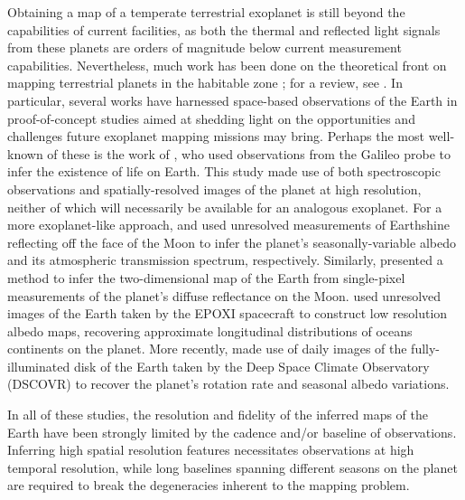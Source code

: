 \documentclass[modern]{aastex62}
\begin{document}
Obtaining a map of a temperate terrestrial exoplanet is still
beyond the capabilities of current facilities, as both the thermal and 
reflected light signals from these planets
are orders of magnitude below current measurement capabilities. Nevertheless,
much work has been done on the theoretical front on mapping terrestrial
planets in the habitable zone
\citep[e.g.,][]{Ford2001,Tinetti2006a,Tinetti2006b,WilliamsGaidos2008,Palle2008,
Kawahara2010,Fujii2012,Berdyugina2017,Haggard2018,Farr2018,Lustig-Yaeger2018};
for a review, see \cite{Cowan2018}. In particular, several works
have harnessed space-based observations of the Earth in proof-of-concept
studies aimed at shedding light on the opportunities and challenges future
exoplanet mapping missions may bring. Perhaps the most well-known of these
is the work of \cite{Sagan1993}, who used observations from the Galileo probe
to infer the existence of life on Earth. This study made use of both
spectroscopic observations and spatially-resolved images of the planet at high
resolution, neither of which will necessarily be available for an analogous exoplanet. 
For a more exoplanet-like approach, \cite{Goode2001} and \cite{Woolf2002} used unresolved measurements of
Earthshine reflecting off the face of the Moon to infer the planet's
seasonally-variable albedo and its atmospheric transmission spectrum,
respectively. Similarly, \cite{Hasinoff2011} presented a method to infer
the two-dimensional map of the Earth from single-pixel measurements of the
planet's diffuse reflectance on the Moon.
\cite{Cowan2009} used unresolved images of the Earth taken
by the EPOXI spacecraft to construct low resolution albedo maps, recovering
approximate longitudinal distributions of oceans continents on the planet. 
More recently, \cite{Jiang2018} made use of daily images of the fully-illuminated
disk of the Earth taken by the Deep Space Climate Observatory (DSCOVR) to recover
the planet's rotation rate and seasonal albedo variations.

In all of these studies, the resolution and fidelity of the inferred maps of the
Earth have been strongly limited by the cadence and/or baseline of observations.
Inferring high spatial resolution features necessitates observations at 
high temporal resolution, while long baselines spanning different seasons
on the planet are required to break the degeneracies inherent to the 
mapping problem.
\end{document}
